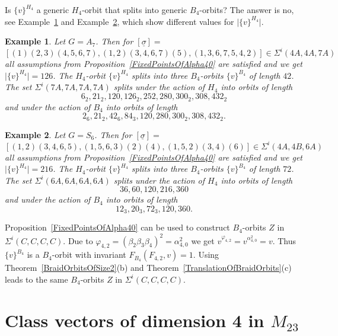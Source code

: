 \documentclass[12pt,a4paper]{article}
\newtheorem{example}{Example}[section]
\numberwithin{equation}{section}
\numberwithin{table}{section}
\begin{document}
\noindent
Is $\{ v \}^{H_4}$ a generic $H_4$-orbit that splits into generic $B_4$-orbits? The answer is no, see 
Example~\ref{A7TransformationFrom4A4A7A} and Example~\ref{S6TransformationFrom4A4B6A}, which show different
values for $\vert \{ v \}^{H_4} \vert$.
%
\begin{example}
\label{A7TransformationFrom4A4A7A}
Let $G = A_7$.
Then for $[\underline{\sigma}]=$
$$[(1)(2,3)(4,5,6,7),(1,2)(3,4,6,7)(5),(1,3,6,7,5,4,2)] \in \Sigma^i(4A,4A,7A)$$
all assumptions from Proposition~\ref{FixedPointsOfAlpha40} are satisfied and we get $\vert \{ v \}^{H_4} \vert = 126$.
The $H_4$-orbit $\{ v \}^{H_4}$ splits into three $B_4$-orbits $\{ v \}^{B_4}$ of length $42$.
The set $\Sigma^i(7A,7A,7A,7A)$ splits under the action of $H_4$ into orbits of length
$$6_2, 21_2, 120, 126_2, 252, 280, 300_2, 308, 432_2$$
and under the action of $B_4$ into orbits of length
$$2_6, 21_2, 42_6, 84_3, 120, 280, 300_2, 308, 432_2.$$
\end{example}
%
\begin{example}
\label{S6TransformationFrom4A4B6A}
Let $G = S_6$.
Then for $[\underline{\sigma}]=$
$$[(1,2)(3,4,6,5),(1,5,6,3)(2)(4),(1,5,2)(3,4)(6)] \in \Sigma^i(4A,4B,6A)$$
all assumptions from Proposition~\ref{FixedPointsOfAlpha40} are satisfied and we get $\vert \{ v \}^{H_4} \vert = 216$.
The $H_4$-orbit $\{ v \}^{H_4}$ splits into three $B_4$-orbits $\{ v \}^{B_4}$ of length $72$.
The set $\Sigma^i(6A,6A,6A,6A)$ splits under the action of $H_4$ into orbits of length
$$36, 60, 120, 216, 360$$
and under the action of $B_4$ into orbits of length
$$12_3, 20_3, 72_3, 120, 360.$$
\end{example}
%
\noindent
Proposition~\ref{FixedPointsOfAlpha40} can be used to construct $B_4$-orbits $Z$ in $\Sigma^i(C,C,C,C)$.
Due to $\varphi_{4,2} = (\beta_2 \beta_3 \beta_4)^2 = \alpha_{4,0}^2$ we get $v^{\varphi_{4,2}} = v^{\alpha_{4,0}^2} = v$.
Thus $\{ v \}^{B_4}$ is a $B_4$-orbit with invariant $F_{B_4}(F_{4,2}, v) = 1$.
Using Theorem~\ref{BraidOrbitsOfSize2}(b) and Theorem~\ref{TranslationOfBraidOrbits}(c) 
leads to the same $B_4$-orbits $Z$ in $\Sigma^i(C,C,C,C)$.

\section{Class vectors of dimension 4 in $M_{23}$}\label{SectionClassVectorsOfDimension4InM23}
\end{document}
